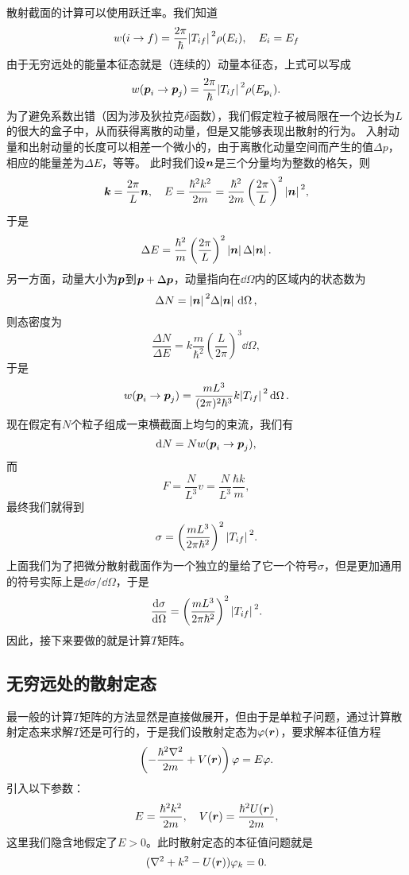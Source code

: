 \documentclass[UTF8, a4paper]{ctexart}
\begin{document}
散射截面的计算可以使用跃迁率。我们知道
\[
    w(i \to f) = \frac{2\pi}{\hbar} \abs*{T_{if}}^2 \rho(E_i), \quad E_i = E_f 
\]
由于无穷远处的能量本征态就是（连续的）动量本征态，上式可以写成
\[
    w(\vb*{p}_i \to \vb*{p}_j) = \frac{2\pi}{\hbar} \abs*{T_{if}}^2 \rho(E_{\vb*{p}_i}).
\]
为了避免系数出错（因为涉及狄拉克$\delta$函数），我们假定粒子被局限在一个边长为$L$的很大的盒子中，从而获得离散的动量，但是又能够表现出散射的行为。
入射动量和出射动量的长度可以相差一个微小的，由于离散化动量空间而产生的值$\Delta p$，相应的能量差为$\Delta E$，等等。
此时我们设$\vb*{n}$是三个分量均为整数的格矢，则
\[
    \vb*{k} = \frac{2\pi}{L} \vb*{n}, \quad E = \frac{\hbar^2 k^2}{2m} = \frac{\hbar^2}{2m} \left( \frac{2\pi}{L} \right)^2 \abs*{\vb*{n}}^2,
\]
于是
\[
    \Delta E = \frac{\hbar^2}{m} \left( \frac{2\pi}{L} \right)^2 \abs*{\vb*{n}} \Delta \abs*{\vb*{n}}.
\]
另一方面，动量大小为$\vb*{p}$到$\vb*{p}+\Delta \vb*{p}$，动量指向在$\dd{\Omega}$内的区域内的状态数为
\[
    \Delta N = \abs*{\vb*{n}}^2 \Delta \abs*{\vb*{n}} \dd{\Omega},
\]
则态密度为
\[
    \frac{\Delta N}{\Delta E} = k \frac{m}{\hbar^2} \left( \frac{L}{2\pi} \right)^3 \dd{\Omega},
\]
于是
\begin{equation}
    w(\vb*{p}_i \to \vb*{p}_j) = \frac{mL^3}{(2\pi)^2 \hbar^3} k \abs*{T_{if}}^2 \dd{\Omega}.
\end{equation}
现在假定有$N$个粒子组成一束横截面上均匀的束流，我们有
\[
    \dd{N} = N w(\vb*{p}_i \to \vb*{p}_j),
\]
而
\[
    F = \frac{N}{L^3} v = \frac{N}{L^3} \frac{\hbar k}{m},
\]
最终我们就得到
\[
    \sigma = \left( \frac{m L^3}{2\pi \hbar^2} \right)^2 \abs*{T_{if}}^2.
\]
上面我们为了把微分散射截面作为一个独立的量给了它一个符号$\sigma$，但是更加通用的符号实际上是$\dd{\sigma}/\dd{\Omega}$，于是
\begin{equation}
    \dv{\sigma}{\Omega} = \left( \frac{m L^3}{2\pi \hbar^2} \right)^2 \abs*{T_{if}}^2.
    \label{eq:cross-section-and-t}
\end{equation}
因此，接下来要做的就是计算$T$矩阵。

\subsection{无穷远处的散射定态}

最一般的计算$T$矩阵的方法显然是直接做展开，但由于是单粒子问题，通过计算散射定态来求解$T$还是可行的，于是我们设散射定态为$\varphi(\vb*{r})$，要求解本征值方程
\[
    \left( - \frac{\hbar^2 \laplacian}{2m} + V(\vb*{r}) \right) \varphi = E \varphi.
\]
引入以下参数：
\begin{equation}
    E = \frac{\hbar^2 k^2}{2m}, \quad V(\vb*{r}) = \frac{\hbar^2 U(\vb*{r})}{2m},
\end{equation}
这里我们隐含地假定了$E>0$。此时散射定态的本征值问题就是
\begin{equation}
    (\laplacian + k^2 - U(\vb*{r})) \varphi_k = 0.
    \label{eq:scattering-eigen}
\end{equation}
\end{document}
